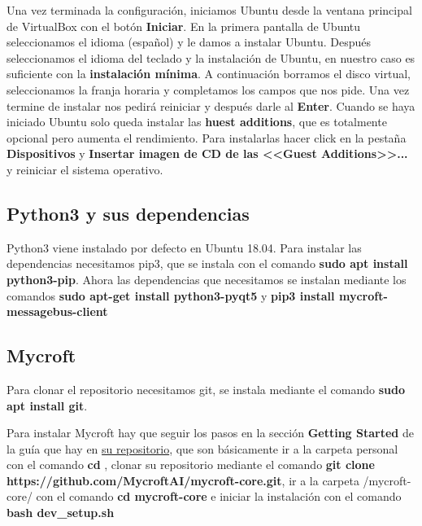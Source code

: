  

Una vez terminada la configuración, iniciamos Ubuntu desde la ventana principal de VirtualBox con el botón \textbf{Iniciar}. En la primera pantalla de Ubuntu seleccionamos el idioma (español) y le damos a instalar Ubuntu.
Después seleccionamos el idioma del teclado y la instalación de Ubuntu, en nuestro caso es suficiente con la \textbf{instalación mínima}. A continuación borramos el disco virtual, seleccionamos la franja horaria y completamos los campos que nos pide. Una vez termine de instalar nos pedirá reiniciar y después darle al \textbf{Enter}. Cuando se haya iniciado Ubuntu solo queda instalar las \textbf{huest additions}, que es totalmente opcional pero aumenta el rendimiento. Para instalarlas hacer click en la pestaña \textbf{Dispositivos} y \textbf{Insertar imagen de CD de las <<Guest Additions>>...} y reiniciar el sistema operativo.

 

\subsection{Python3 y sus dependencias}

Python3 viene instalado por defecto en Ubuntu 18.04. Para instalar las dependencias necesitamos pip3, que se instala con el comando \textbf{sudo apt install python3-pip}. Ahora las dependencias que necesitamos se instalan mediante los comandos \textbf{sudo apt-get install python3-pyqt5} y \textbf{pip3 install mycroft-messagebus-client}

\subsection{Mycroft}

Para clonar el repositorio necesitamos git, se instala mediante el comando \textbf{sudo apt install git}.

Para instalar Mycroft hay que seguir los pasos en la sección \textbf{Getting Started} de la guía que hay en \href{https://github.com/MycroftAI/mycroft-core}{su repositorio}, que son básicamente ir a la carpeta personal con el comando \textbf{cd \detokenize{~}}, clonar su repositorio mediante el comando \textbf{git clone https://github.com/MycroftAI/mycroft-core.git}, ir a la carpeta /mycroft-core/ con el comando \textbf{cd mycroft-core} e iniciar la instalación con el comando \textbf{bash dev\_setup.sh}

